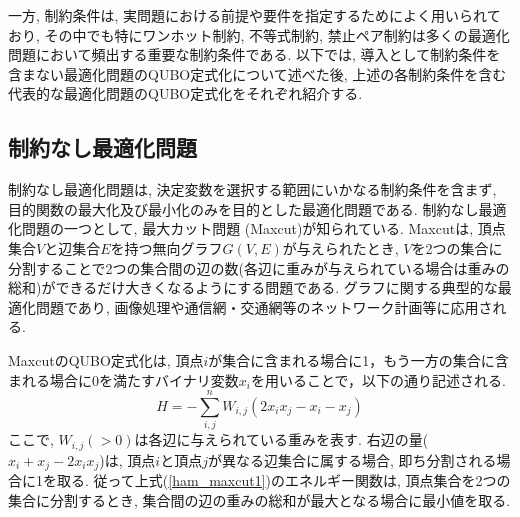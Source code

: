 \documentclass[submit,techrep,noauthor]{ipsj}
\begin{document}
一方, 制約条件は, 実問題における前提や要件を指定するためによく用いられており, その中でも特にワンホット制約, 不等式制約, 禁止ペア制約は多くの最適化問題において頻出する重要な制約条件である. 以下では, 導入として制約条件を含まない最適化問題のQUBO定式化について述べた後, 上述の各制約条件を含む代表的な最適化問題のQUBO定式化をそれぞれ紹介する.

\subsection{制約なし最適化問題}

制約なし最適化問題は, 決定変数を選択する範囲にいかなる制約条件を含まず, 目的関数の最大化及び最小化のみを目的とした最適化問題である. 制約なし最適化問題の一つとして, 最大カット問題 (Maxcut)が知られている. Maxcutは, 頂点集合$V$と辺集合$E$を持つ無向グラフ$G(V,E)$が与えられたとき, $V$を2つの集合に分割することで2つの集合間の辺の数(各辺に重みが与えられている場合は重みの総和)ができるだけ大きくなるようにする問題である\cite{maxcut}. グラフに関する典型的な最適化問題であり, 画像処理や通信網・交通網等のネットワーク計画等に応用される.

MaxcutのQUBO定式化は, 頂点$i$が集合に含まれる場合に1，もう一方の集合に含まれる場合に0を満たすバイナリ変数$x_{i}$を用いることで，以下の通り記述される. 
\begin{equation}
H = -\sum_{i,j}^{n}W_{i,j}(2x_{i}x_{j}-x_{i}-x_{j}) \label{ham_maxcut1}
\end{equation}
ここで, $W_{i,j}(>0)$は各辺に与えられている重みを表す. 右辺の量($x_{i}+x_{j}-2x_{i}x_{j}$)は, 頂点$i$と頂点$j$が異なる辺集合に属する場合, 即ち分割される場合に1を取る. 従って上式(\ref{ham_maxcut1})のエネルギー関数は, 頂点集合を2つの集合に分割するとき, 集合間の辺の重みの総和が最大となる場合に最小値を取る.

\end{document}
